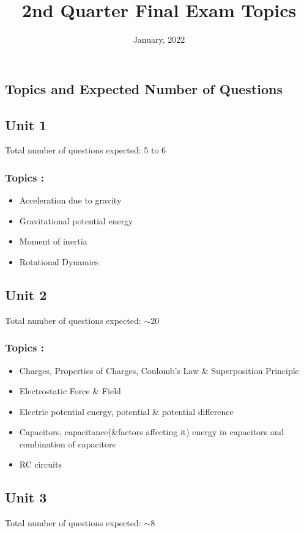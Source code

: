\documentclass[13pt,addpoints]{exam}
\date{January, 2022}\usepackage{geometry}
\begin{document}
	\title{2nd Quarter Final Exam Topics}
	\maketitle
	\begin{center}
		\section*{Topics and Expected Number of Questions}
	\end{center}
	\subsection*{Unit 1}
	Total number of questions expected: 5 to 6
	\subsubsection*{Topics :}
	\begin{itemize}
		\item Acceleration due to gravity
		\item Gravitational potential energy
		\item Moment of inertia
		\item Rotational Dynamics
	\end{itemize}
	\subsection*{Unit 2}
	Total number of questions expected:  $\sim20$
	\subsubsection*{Topics :}
	\begin{itemize}
		\item Charges, Properties of Charges, Coulomb's Law \& Superposition Principle
		\item Electrostatic Force \& Field
		\item Electric potential energy, potential \& potential difference
		\item Capacitors, capacitance(\&factors affecting it) energy in capacitors and combination of capacitors
		\item RC circuits
	\end{itemize}
	\subsection*{Unit 3}
	Total number of questions expected:  $\sim8$
\end{document}
